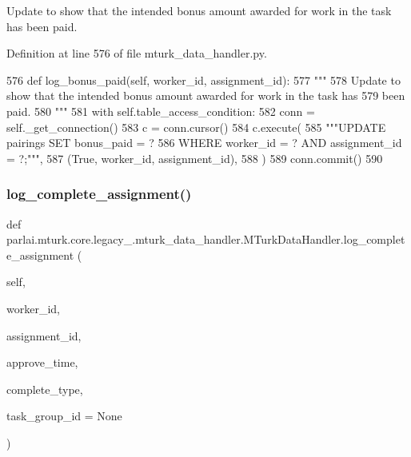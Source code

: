 \begin{DoxyVerb}Update to show that the intended bonus amount awarded for work in the task has
been paid.
\end{DoxyVerb}
 

Definition at line 576 of file mturk\+\_\+data\+\_\+handler.\+py.


\begin{DoxyCode}
576     \textcolor{keyword}{def }log\_bonus\_paid(self, worker\_id, assignment\_id):
577         \textcolor{stringliteral}{"""}
578 \textcolor{stringliteral}{        Update to show that the intended bonus amount awarded for work in the task has}
579 \textcolor{stringliteral}{        been paid.}
580 \textcolor{stringliteral}{        """}
581         with self.table\_access\_condition:
582             conn = self.\_get\_connection()
583             c = conn.cursor()
584             c.execute(
585                 \textcolor{stringliteral}{"""UPDATE pairings SET bonus\_paid = ?}
586 \textcolor{stringliteral}{                         WHERE worker\_id = ? AND assignment\_id = ?;"""},
587                 (\textcolor{keyword}{True}, worker\_id, assignment\_id),
588             )
589             conn.commit()
590 
\end{DoxyCode}
\mbox{\label{classparlai_1_1mturk_1_1core_1_1legacy__2018_1_1mturk__data__handler_1_1MTurkDataHandler_af086a3896a105801c66195efc8f95c03}} 
\subsubsection{\texorpdfstring{log\+\_\+complete\+\_\+assignment()}{log\_complete\_assignment()}}
{\footnotesize\ttfamily def parlai.\+mturk.\+core.\+legacy\+\_.\+mturk\+\_\+data\+\_\+handler.\+M\+Turk\+Data\+Handler.\+log\+\_\+complete\+\_\+assignment (\begin{DoxyParamCaption}\item[{}]{self,  }\item[{}]{worker\+\_\+id,  }\item[{}]{assignment\+\_\+id,  }\item[{}]{approve\+\_\+time,  }\item[{}]{complete\+\_\+type,  }\item[{}]{task\+\_\+group\+\_\+id = {\ttfamily None} }\end{DoxyParamCaption})}

